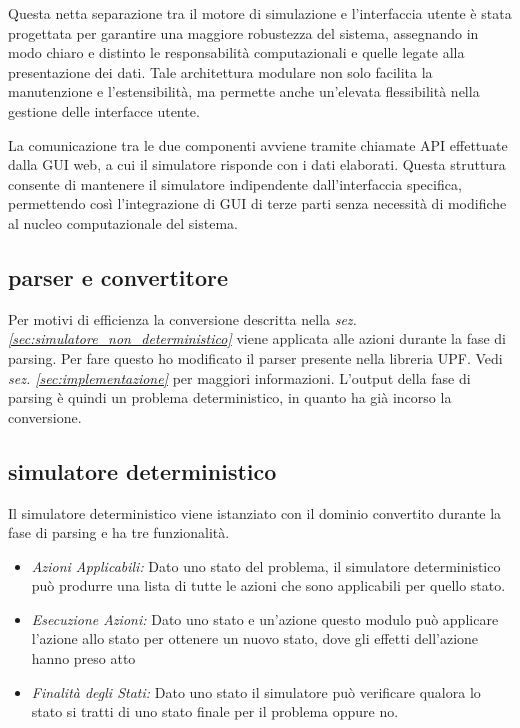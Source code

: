 \documentclass[a4paper, 11pt, titlepage, twoside, openany]{book}
\begin{document}
Questa netta separazione tra il motore di simulazione e l'interfaccia utente è stata progettata per garantire una maggiore robustezza del sistema, assegnando in modo chiaro e distinto le responsabilità computazionali e quelle legate alla presentazione dei dati. Tale architettura modulare non solo facilita la manutenzione e l'estensibilità, ma permette anche un'elevata flessibilità nella gestione delle interfacce utente.

La comunicazione tra le due componenti avviene tramite chiamate API effettuate dalla GUI web, a cui il simulatore risponde con i dati elaborati. Questa struttura consente di mantenere il simulatore indipendente dall'interfaccia specifica, permettendo così l'integrazione di GUI di terze parti senza necessità di modifiche al nucleo computazionale del sistema.

\subsection{parser e convertitore}
Per motivi di efficienza la conversione descritta nella \textit{sez. \ref{sec:simulatore_non_deterministico}} viene applicata alle azioni durante la fase di parsing. Per fare questo ho modificato il parser presente nella libreria UPF. Vedi \textit{sez. \ref{sec:implementazione}} per maggiori informazioni.
L'output della fase di parsing è quindi un problema deterministico, in quanto ha già incorso la conversione.

\subsection{simulatore deterministico}
Il simulatore deterministico viene istanziato con il dominio convertito durante la fase di parsing e ha tre funzionalità.
\begin{itemize}
    \item \textit{Azioni Applicabili:} Dato uno stato del problema, il simulatore deterministico può produrre una lista di tutte le azioni che sono applicabili per quello stato.
    \item \textit{Esecuzione Azioni:} Dato uno stato e un'azione questo modulo può applicare l'azione allo stato per ottenere un nuovo stato, dove gli effetti dell'azione hanno preso atto
    \item \textit{Finalità degli Stati:} Dato uno stato  il simulatore può verificare qualora lo stato si tratti di uno stato finale per il problema oppure no.
\end{itemize}
\end{document}
